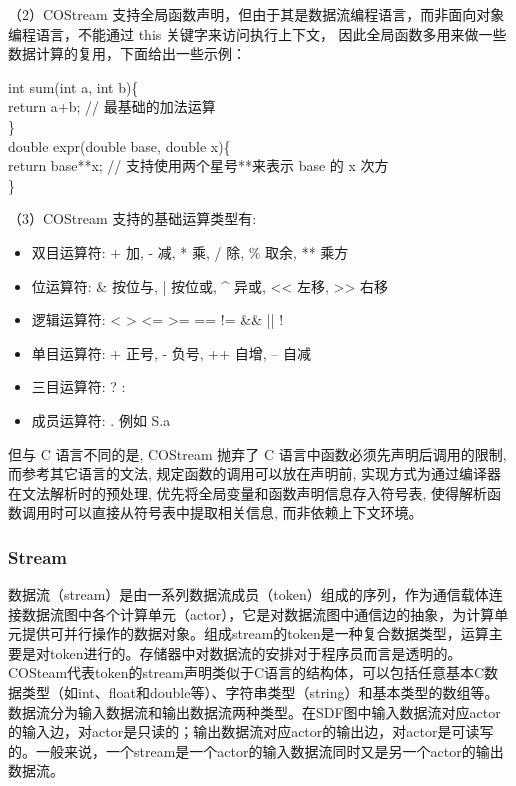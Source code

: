 （2）COStream 支持全局函数声明，但由于其是数据流编程语言，而非面向对象编程语言，不能通过 this 关键字来访问执行上下文， 因此全局函数多用来做一些数据计算的复用，下面给出一些示例：

\begin{algorithm}\label{algo:standard}
int sum(int a, int b)\{\\
\hspace*{1 pc} return a+b; // 最基础的加法运算\\
\}\\
double expr(double base, double x)\{\\
\hspace*{1 pc} return base**x; // 支持使用两个星号**来表示 base 的 x 次方\\
\}
\end{algorithm}
（3）COStream 支持的基础运算类型有: 
\begin{itemize}
    \item 双目运算符: + 加, - 减, * 乘, / 除, \% 取余, ** 乘方
    \item 位运算符: \& 按位与, | 按位或, \^{} 异或, << 左移, >> 右移
    \item 逻辑运算符: < > <= >= == != \&\& || !
    \item 单目运算符: + 正号, - 负号, ++ 自增, -- 自减
    \item 三目运算符: ? :
    \item 成员运算符: . 例如 S.a
\end{itemize}

但与 C 语言不同的是, COStream 抛弃了 C 语言中函数必须先声明后调用的限制, 而参考其它语言的文法, 规定函数的调用可以放在声明前, 实现方式为通过编译器在文法解析时的预处理, 优先将全局变量和函数声明信息存入符号表, 使得解析函数调用时可以直接从符号表中提取相关信息, 而非依赖上下文环境。

\subsubsection{Stream}
数据流（stream）是由一系列数据流成员（token）组成的序列，作为通信载体连接数据流图中各个计算单元（actor），它是对数据流图中通信边的抽象，为计算单元提供可并行操作的数据对象。组成stream的token是一种复合数据类型，运算主要是对token进行的。存储器中对数据流的安排对于程序员而言是透明的。COSteam代表token的stream声明类似于C语言的结构体，可以包括任意基本C数据类型（如int、float和double等）、字符串类型（string）和基本类型的数组等。数据流分为输入数据流和输出数据流两种类型。在SDF图中输入数据流对应actor的输入边，对actor是只读的；输出数据流对应actor的输出边，对actor是可读写的。一般来说，一个stream是一个actor的输入数据流同时又是另一个actor的输出数据流。

